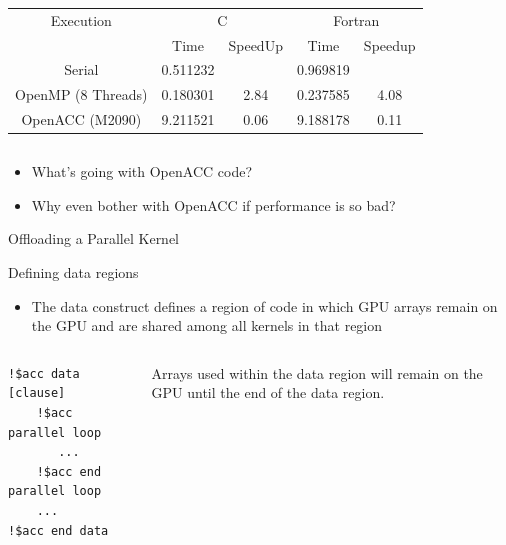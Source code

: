 \documentclass[c,mathserif,compress,xcolor=svgnames]{beamer}
\newenvironment{eblock}[0]
{
\begin{beamerboxesrounded}[upper=uppercol2,lower=lowercol2,shadow=true]}
{\end{beamerboxesrounded}}
\begin{document}
\begin{frame}
  \begin{columns}
    \begin{eblock}{}
      \begin{tabular}{|c|c|c|c|c|}
        \hline
        Execution& \multicolumn{2}{c|}{C}& \multicolumn{2}{c|}{Fortran} \\
        \cline{2-5}
        &  Time & SpeedUp & Time & Speedup \\
        \hline
        Serial & 0.511232 & & 0.969819 & \\
        OpenMP (8 Threads) & 0.180301 & 2.84 & 0.237585 & 4.08 \\
        OpenACC (M2090) & 9.211521 & 0.06 & 9.188178 & 0.11 \\
          \hline
      \end{tabular}
    \end{eblock}
  \end{columns}
  \begin{itemize}
    \item What's going with OpenACC code?
    \item Why even bother with OpenACC if performance is so bad?
  \end{itemize}
\end{frame}

\begin{frame}{\small Offloading a Parallel Kernel}
  
\end{frame}

\begin{frame}[fragile]{\small Defining data regions}
  \begin{itemize}
    \item The data construct defines a region of code in which GPU arrays remain on the GPU and are shared among all kernels in that region
  \end{itemize}
  \begin{columns}
    \column{9cm}
  \begin{eblock}{}
    \begin{columns}
      \column{3.5cm}
      \begin{lstlisting}[basicstyle=\tiny\ttfamily,language=OmpFortran]
!$acc data [clause]
    !$acc parallel loop
       ...
    !$acc end parallel loop
    ...
!$acc end data
      \end{lstlisting}
      \column{0.5cm}
      \fontsize{55}{20}\selectfont{\color{tigerspurple}\}}
      \column{3cm}
      Arrays used within the data region will remain on the GPU until the end of the data region.
    \end{columns}
  \end{eblock}
  \end{columns}
\end{frame}
\end{document}
